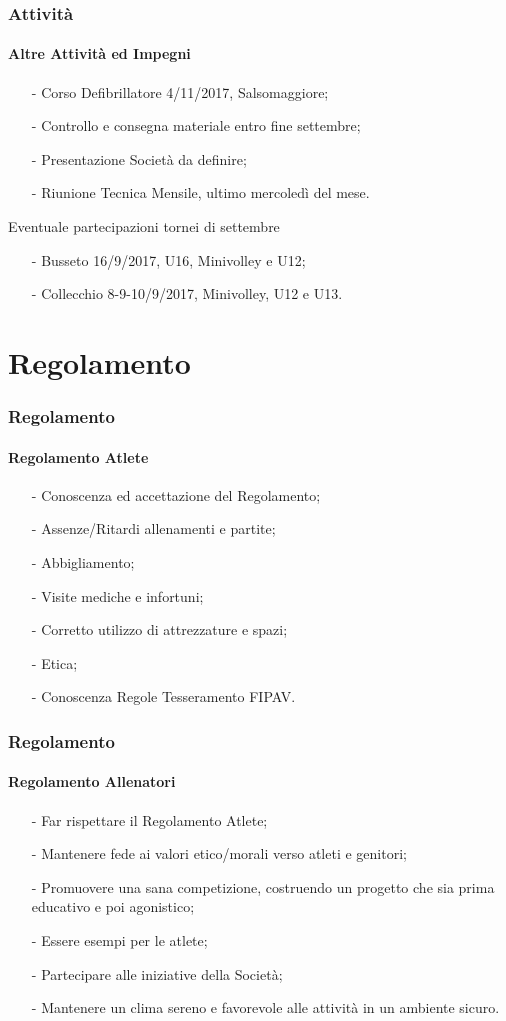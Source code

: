 \documentclass{beamer}
\begin{document}
\begin{frame}
\frametitle{Attività}
\framesubtitle{Altre Attività ed Impegni}
\begin{itemize}
\item[-]Corso Defibrillatore 4/11/2017, Salsomaggiore;
\item[-]Controllo e consegna materiale entro fine settembre;
\item[-]Presentazione Società da definire;
\item[-]Riunione Tecnica Mensile, ultimo mercoledì del mese.
\end{itemize}

\begin{block}{Eventuale partecipazioni tornei di settembre}
\begin{itemize}
\item[-]Busseto 16/9/2017, U16, Minivolley e U12;
\item[-]Collecchio 8-9-10/9/2017, Minivolley, U12 e U13.
\end{itemize}
\end{block}
\end{frame}

\section{Regolamento}


\begin{frame}
\frametitle{Regolamento}
\framesubtitle{Regolamento Atlete}
\begin{itemize}
\item[-]Conoscenza ed accettazione del Regolamento;
\item[-]Assenze/Ritardi allenamenti e partite;
\item[-]Abbigliamento;
\item[-]Visite mediche e infortuni;
\item[-]Corretto utilizzo di attrezzature e spazi;
\item[-]Etica;
\item[-]Conoscenza Regole Tesseramento FIPAV.
\end{itemize}
\end{frame}


\begin{frame}
\frametitle{Regolamento}
\framesubtitle{Regolamento Allenatori}
\begin{itemize}[<+->]
\item[-]Far rispettare il Regolamento Atlete;
\item[-]Mantenere fede ai valori etico/morali verso atleti e genitori;
\item[-]Promuovere una sana competizione, costruendo un progetto che sia prima educativo e poi agonistico;
\item[-]Essere esempi per le atlete;
\item[-]Partecipare alle iniziative della Società;
\item[-]Mantenere un clima sereno e favorevole alle attività in un ambiente sicuro.
\end{itemize}
\end{frame}
\end{document}
